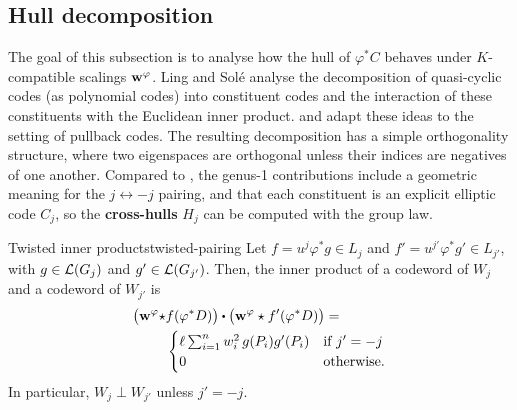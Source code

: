 \documentclass[twocolumn, 11pt]{scrartcl}
\begin{document}
\subsection{Hull decomposition} \label{subsection:hull-decomposition}

The goal of this subsection is to analyse how the hull of $\varphi^*C$ behaves under $K$-compatible scalings $\mathbf{w}^\varphi$. Ling and Sol\'e \cite{ling2001algebraic} analyse the decomposition of quasi-cyclic codes (as polynomial codes) into constituent codes and the interaction of these constituents with the Euclidean inner product.  and  adapt these ideas to the setting of pullback codes. The resulting decomposition has a simple orthogonality structure, where two eigenspaces are orthogonal unless their indices are negatives of one another. Compared to \cite[Prop.~4.1, Thm.~4.2]{ling2001algebraic}, the genus-1 contributions include a geometric meaning for the $j\leftrightarrow-j$ pairing, and that each constituent is an explicit elliptic code $C_j$, so the \textbf{cross-hulls} $H_j$ can be computed with the group law.

\begin{lemma}{Twisted inner products}{twisted-pairing}
    Let $f=u^j\varphi^*g\in L_j$ and $f'=u^{j'}\varphi^*g'\in L_{j'}$, with $g\in\mathcal{L}(G_j)$ and $g'\in\mathcal{L}(G_{j'})$. Then, the inner product of a codeword of $W_j$ and a codeword of $W_{j'}$ is
        \begin{align*}
            \pa[\big]{\bfw^\varphi \star &f(\varphi^*D)} \dotpr \pa[\big]{\bfw^\varphi\star f'(\varphi^*D)}= \\
            &\begin{cases}
            \textstyle \ell\sum_{i=1}^n w_i^2\,g(P_i)g'(P_i) &\text{if }j'=-j \\
            0 &\text{otherwise.}
            \end{cases}
        \end{align*}
        In particular, $W_j\perp W_{j'}$ unless $j'=-j$.
\end{lemma}
\end{document}

